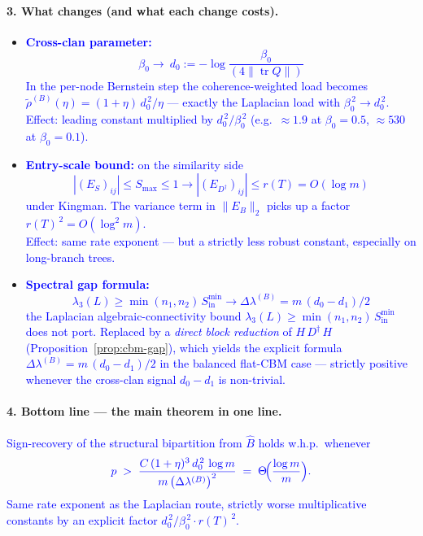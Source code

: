 \documentclass[11pt]{article}
\newcommand{\new}[1]{\textcolor{blue}{#1}}
\newcommand{\newmath}[1]{{\color{blue} #1}}
\theoremstyle{remark}
\newcommand{\1}{\mathbf{1}}
\newcommand{\Tr}{\operatorname{tr}}
\newcommand{\Ddist}{D^{\dagger}}      %
\newcommand{\Bop}{B}
\newcommand{\Hop}{H}                  %
\newcommand{\rT}{r(T)}                %
\begin{document}
\paragraph{3. What changes (and what each change costs).}
\begin{itemize}
  \item \new{\textbf{Cross-clan parameter:} $$\beta_{0}\longrightarrow\
        d_{0} := -\log \frac{\beta_{0}}{(4\|\Tr Q\|)}$$
        In the per-node Bernstein step the coherence-weighted load
        becomes $\tilde\rho^{(B)}(\eta) = (1+\eta)\,d_{0}^{\,2}/\eta$ --- exactly
        the Laplacian load with $\beta_{0}^{\,2} \to d_{0}^{\,2}$.\\
        Effect: leading constant multiplied by $d_{0}^{\,2}/\beta_{0}^{\,2}$
        (e.g.\ $\approx 1.9$ at $\beta_{0} = 0.5$, $\approx 530$ at
        $\beta_{0} = 0.1$).}
  \item \new{\textbf{Entry-scale bound:} on the similarity side
        $$
        |(E_{S})_{ij}| \le S_{\max} \le 1 
        \longrightarrow
        |(E_{\Ddist})_{ij}| \le \rT = O(\log m)
        $$
        under Kingman.
        The variance term in $\|E_{B}\|_{2}$ picks up a factor
        $\rT^{\,2} = O(\log^{2} m)$.\\
        Effect: same rate exponent --- but a strictly less robust
        constant, especially on long-branch trees.}
  \item \new{\textbf{Spectral gap formula:} 
  $$
  \lambda_{3}(L) \ge \min(n_{1},n_{2})\,S_{\mathrm{in}}^{\min}
  \longrightarrow
  \Delta\lambda^{(B)} = m\,(d_{0} - d_{1})/2
  $$
  the Laplacian
        algebraic-connectivity bound
        $\lambda_{3}(L) \ge \min(n_{1},n_{2})\,S_{\mathrm{in}}^{\min}$
        does not port. Replaced by a \emph{direct block reduction} of
        $\Hop\,\Ddist\,\Hop$ (Proposition~\ref{prop:cbm-gap}), which
        yields the explicit formula
        $\Delta\lambda^{(B)} = m\,(d_{0} - d_{1})/2$
        in the balanced flat-CBM case --- strictly positive whenever
        the cross-clan signal $d_{0} - d_{1}$ is non-trivial.}
\end{itemize}

\paragraph{4. Bottom line --- the main theorem in one line.}
\new{Sign-recovery of the structural bipartition from $\widehat\Bop$
holds w.h.p.\ whenever}
\begin{equation*}
\newmath{
  p \;>\; \frac{C\,(1 + \eta)^{3}\, d_{0}^{\,2}\, \log m}
                 {m\,\bigl(\Delta\lambda^{(B)}\bigr)^{2}}
       \;=\; \Theta\!\Bigl(\frac{\log m}{m}\Bigr).
}
\end{equation*}
\new{Same rate exponent as the Laplacian route, strictly worse
multiplicative constants by an explicit factor
$d_{0}^{\,2}/\beta_{0}^{\,2}\cdot \rT^{\,2}$.}
\end{document}
